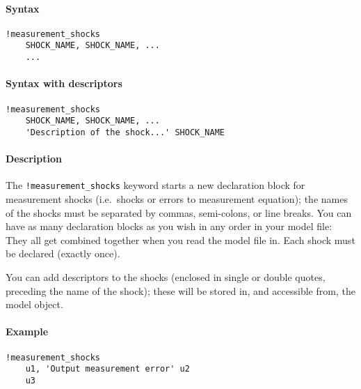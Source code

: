 


	\paragraph{Syntax}\label{syntax}

\begin{verbatim}
!measurement_shocks
    SHOCK_NAME, SHOCK_NAME, ...
    ...
\end{verbatim}

\paragraph{Syntax with descriptors}\label{syntax-with-descriptors}

\begin{verbatim}
!measurement_shocks
    SHOCK_NAME, SHOCK_NAME, ...
    'Description of the shock...' SHOCK_NAME
\end{verbatim}

\paragraph{Description}\label{description}

The \texttt{!measurement\_shocks} keyword starts a new declaration block
for measurement shocks (i.e.~shocks or errors to measurement equation);
the names of the shocks must be separated by commas, semi-colons, or
line breaks. You can have as many declaration blocks as you wish in any
order in your model file: They all get combined together when you read
the model file in. Each shock must be declared (exactly once).

You can add descriptors to the shocks (enclosed in single or double
quotes, preceding the name of the shock); these will be stored in, and
accessible from, the model object.

\paragraph{Example}\label{example}

\begin{verbatim}
!measurement_shocks
    u1, 'Output measurement error' u2
    u3
\end{verbatim}


